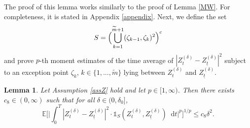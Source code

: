 \documentclass[11pt,a4paper]{article}
\numberwithin{equation}{section}
\newtheorem{lemma}[theorem]{Lemma}
\theoremstyle{definition}
\newcommand{\E}{{\mathbb{E}}}
\newcommand{\diff}{\mathop{}\!\mathrm{d}}
\begin{document}
The proof of this lemma works similarly to the proof of Lemma \ref{MW}. For completeness, it is stated in Appendix \ref{appendix}. 
Next, we define the set
\begin{equation}\label{setS}
    S = \Bigl(\bigcup_{k=1}^{\widetilde m+1} (\zeta_{k-1},\zeta_k)^2\Bigr)^c
\end{equation} 
and prove $p$-th moment estimates of the time average of $|Z_{t}^{(\delta)} - Z_{\underline t}^{(\delta)}|^2$ subject to an exception point $\zeta_k$, $k\in\{1,...,\widetilde m\}$ lying between $Z_t^{(\delta)}$ and $Z_{\underline t}^{(\delta)}$.

\begin{lemma}\label{LemExepSet}
    Let Assumption \ref{assZ} hold and let $p\in [1,\infty)$. Then  there exists  $c_8\in(0, \infty)$ such that for all $\delta\in(0,\delta_0]$, 
    \begin{equation}
        \E\Big[\Big|\int_0^T  |Z_{t}^{(\delta)} - Z_{\underline t}^{(\delta)}|^2\cdot \mathds{1}_{S}(Z_{t}^{(\delta)},Z_{\underline t}^{(\delta)}) \diff t \Big|^p\Big]^{1/p}\leq c_8 \delta^{2}. 
    \end{equation}
\end{lemma}
\end{document}
